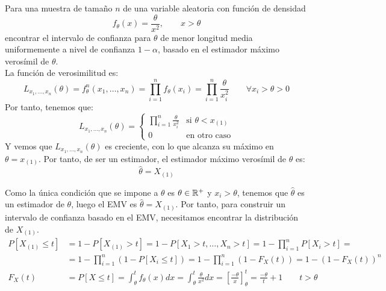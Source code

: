 \begin{ejercicio} 
    Para una muestra de tamaño $n$ de una variable aleatoria con función de densidad
    \begin{equation*}
        f_\theta(x) = \frac{\theta}{x^2}, \qquad x>\theta
    \end{equation*}
    encontrar el intervalo de confianza para $\theta$ de menor longitud media uniformemente a nivel de confianza $1 - \alpha$, basado en el estimador máximo verosímil de $\theta$.\\

    \noindent
    La función de verosimilitud es:
    \begin{equation*}
        L_{x_1,\ldots,x_n}(\theta) = f_\theta^n(x_1, \ldots, x_n) = \prod_{i=1}^{n}f_\theta(x_i) = \prod_{i=1}^{n} \frac{\theta}{x_i^2} \qquad \forall x_i > \theta > 0
    \end{equation*}
    Por tanto, tenemos que:
    \begin{equation*}
        L_{x_1,\ldots,x_n}(\theta) = \left\{\begin{array}{ll}
            \prod\limits_{i=1}^{n}\frac{\theta}{x_i^2} & \text{si\ } \theta < x_{(1)}  \\
             0 & \text{en otro caso} 
        \end{array}\right. 
    \end{equation*}
    Y vemos que $L_{x_1,\ldots,x_n}(\theta)$ es creciente, con lo que alcanza su máximo en $\theta = x_{(1)}$. Por tanto, de ser un estimador, el estimador máximo verosímil de $\theta$ es:
    \begin{equation*}
        \hat{\theta} = X_{(1)}
    \end{equation*}

    Como la única condición que se impone a $\theta$ es $\theta\in\mathbb{R}^+$ y $x_i>\theta$, tenemos que $\hat{\theta}$ es un estimador de $\theta$, luego el EMV es $\hat{\theta} = X_{(1)}$. Por tanto, para construir un intervalo de confianza basado en el EMV, necesitamos encontrar la distribución de $X_{(1)}$.
    \begin{align*}
        P[X_{(1)}\leq t] &= 1-P[X_{(1)}>t] = 1-P[X_1>t, \ldots, X_n>t] = 1-\prod_{i=1}^{n}P[X_i>t] =\\&= 1-\prod_{i=1}^{n}(1-P[X_i\leq t]) = 1-\prod_{i=1}^{n}(1-F_X(t)) = 1-{(1-F_X(t))}^{n}\\
        F_X(t) &= P[X\leq t] = \int_{\theta}^{t}f_\theta(x)dx = \int_{\theta}^{t}\frac{\theta}{x^2}dx = \left[\frac{-\theta}{x}\right]_\theta^t = \frac{-\theta}{t} + 1 \qquad t>\theta
    \end{align*}


\end{ejercicio}
